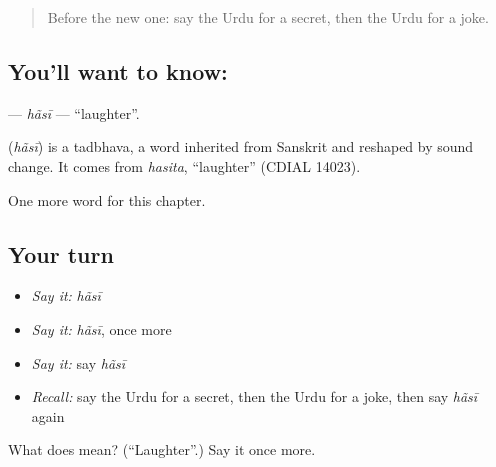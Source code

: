 \begin{quote}
Before the new one: say the Urdu for a secret, then the Urdu for a joke.
\end{quote}

\subsection*{You'll want to know: }
\textbf{} — \emph{hãsī} — \textquotedblleft{}laughter\textquotedblright{}.

\begin{cousinweb}
\textbf{} (\emph{hãsī}) is a tadbhava, a word inherited from Sanskrit and reshaped by sound change. It comes from \emph{hasita}, \textquotedblleft{}laughter\textquotedblright{} (CDIAL 14023).
\end{cousinweb}

\begin{grammarlens}[title={What you've built}]
One more word for this chapter.
\end{grammarlens}

\subsection*{Your turn}
\begin{itemize}
\raggedright
  \item \emph{Say it:} \emph{hãsī}
  \item \emph{Say it:} \emph{hãsī}, once more
  \item \emph{Say it:} say \emph{hãsī}
  \item \emph{Recall:} say the Urdu for a secret, then the Urdu for a joke, then say \emph{hãsī} again
\end{itemize}

\begin{tcolorbox}[breakable,colback=teal!4,colframe=teal!35!black,title={Before you move on}]
What does  mean? (\textquotedblleft{}Laughter\textquotedblright{}.) Say it once more.
\end{tcolorbox}
